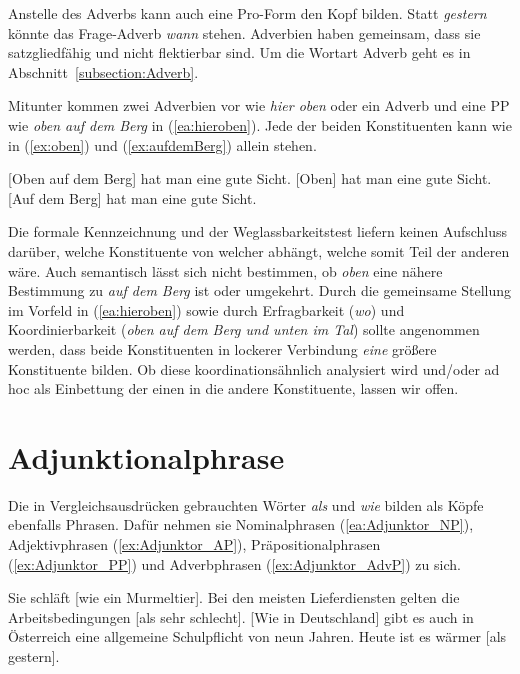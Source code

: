 Anstelle des Adverbs kann auch eine Pro-Form den Kopf bilden. Statt \textit{gestern} könnte das Frage-Adverb \textit{wann} stehen. Adverbien haben gemeinsam, dass sie satzgliedfähig und nicht flektierbar sind. Um die Wortart Adverb geht es in Abschnitt~\ref{subsection:Adverb}.
 

Mitunter kommen zwei Adverbien vor wie \textit{hier oben} oder ein Adverb und eine PP wie \textit{oben auf dem Berg} in (\ref{ea:hieroben}). Jede der beiden Konstituenten kann wie in (\ref{ex:oben}) und (\ref{ex:aufdemBerg}) allein stehen. 

\ea \label{ea:AdvAdv/PP}
\ea \label{ea:hieroben} [Oben auf dem Berg] hat man eine gute Sicht.
\ex \label{ex:oben} [Oben] hat man eine gute Sicht.
\ex \label{ex:aufdemBerg} [Auf dem Berg] hat man eine gute Sicht.
\z 
\z 

Die formale Kennzeichnung und der Weglassbarkeitstest liefern keinen Aufschluss darüber, welche Konstituente von welcher abhängt, welche somit Teil der anderen wäre. Auch semantisch lässt sich nicht bestimmen, ob \textit{oben} eine nähere Bestimmung zu \textit{auf dem Berg} ist oder umgekehrt. Durch die gemeinsame Stellung im Vorfeld in (\ref{ea:hieroben}) sowie durch Erfragbarkeit (\textit{wo}) und Koordinierbarkeit (\textit{oben auf dem Berg und unten im Tal}) sollte angenommen werden, dass beide Konstituenten in lockerer Verbindung \textit{eine} größere Konstituente bilden. Ob diese koordinationsähnlich analysiert wird und/oder ad hoc als Einbettung der einen in die andere Konstituente, lassen wir offen.    


\section{Adjunktionalphrase}\label{section:Adjunktionalphrase}

Die in Vergleichsausdrücken gebrauchten Wörter \textit{als} und \textit{wie} bilden als Köpfe ebenfalls Phrasen. Dafür nehmen sie Nominalphrasen (\ref{ea:Adjunktor_NP}), Adjektivphrasen (\ref{ex:Adjunktor_AP}), Präpositionalphrasen (\ref{ex:Adjunktor_PP}) und Adverbphrasen (\ref{ex:Adjunktor_AdvP}) zu sich.

\ea\label{Adjunktorphrasen}
\ea\label{ea:Adjunktor_NP} Sie schläft [wie ein Murmeltier].
\ex\label{ex:Adjunktor_AP} Bei den meisten Lieferdiensten gelten die Arbeitsbedingungen [als sehr schlecht].
\ex\label{ex:Adjunktor_PP} [Wie in Deutschland] gibt es auch in Österreich eine allgemeine Schulpflicht von neun Jahren.
\ex\label{ex:Adjunktor_AdvP} Heute ist es wärmer  [als gestern].
\z 
\z      

